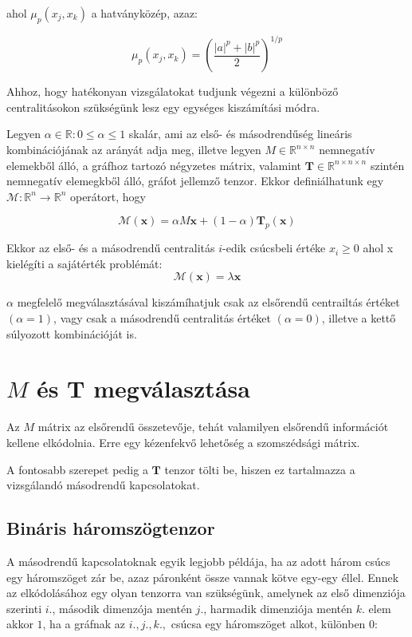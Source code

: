 \documentclass[12pt,numbers=noenddot]{report}
\begin{document}
ahol $\mu_p(x_j,x_k)$ a hatványközép, azaz:

$$\mu_p(x_j,x_k) = \left(\frac{|a|^p+|b|^p}{2}\right)^{1/p}$$


Ahhoz, hogy hatékonyan vizsgálatokat tudjunk végezni a különböző 
centralitásokon szükségünk lesz egy egységes kiszámítási módra.

Legyen $\alpha \in \mathbb{R}: 0 \leq \alpha \leq 1$ skalár, ami az első- 
és másodrendűség lineáris kombinációjának az arányát adja meg,
illetve legyen $M \in \mathbb{R}^{n \times n}$ nemnegatív elemekből álló, 
a gráfhoz tartozó négyzetes mátrix, valamint $\boldsymbol{T} \in 
\mathbb{R}^{n \times n \times n}$ szintén nemnegatív elemegkből álló, 
gráfot jellemző tenzor. Ekkor definiálhatunk egy $\mathcal{M}: 
\mathbb{R}^n \rightarrow \mathbb{R}^n$ operátort, hogy

$$\mathcal{M}(\boldsymbol{x}) = \alpha M \boldsymbol{x} + (1-\alpha) 
\boldsymbol{T}_p(\boldsymbol{x})$$

\noindent
Ekkor az első- és a másodrendű centralitás $i$-edik csúcsbeli értéke $x_i 
\geq 0$ ahol x kielégíti a sajátérték problémát:
$$\mathcal{M}(\boldsymbol{x}) = \lambda \boldsymbol{x}$$

\noindent
$\alpha$ megfelelő megválasztásával kiszámíhatjuk csak az elsőrendű 
centrailtás értéket $(\alpha = 1)$, vagy csak a másodrendű centralitás 
értéket $(\alpha = 0)$, illetve a kettő súlyozott kombinációját is.


\section{$M$ és $\boldsymbol{T}$ megválasztása}

Az $M$ mátrix az elsőrendű összetevője, tehát valamilyen elsőrendű 
információt kellene elkódolnia. 
Erre egy kézenfekvő lehetőség a szomszédsági mátrix.

A fontosabb szerepet pedig a $\boldsymbol{T}$ tenzor tölti be, hiszen ez 
tartalmazza a vizsgálandó másodrendű kapcsolatokat.

\subsection*{Bináris háromszögtenzor}

A másodrendű kapcsolatoknak egyik legjobb példája, ha az adott három csúcs egy
háromszöget zár be, azaz páronként össze vannak kötve egy-egy éllel.
Ennek az elkódolásához egy olyan tenzorra van szükségünk, amelynek az első 
dimenziója szerinti $i.$, második dimenzója mentén $j.$, harmadik dimenziója
mentén $k.$ elem akkor $1$, ha a gráfnak az $i., j., k.,$ csúcsa egy háromszöget
alkot, különben $0$:
\end{document}
